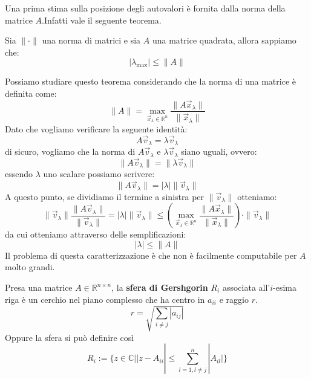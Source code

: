 Una prima stima sulla posizione degli autovalori è fornita dalla norma della
matrice $A$.Infatti vale il seguente teorema.
\begin{teorema}
    Sia $\|\cdot\|$ una norma di matrici e sia $A$ una matrice quadrata, allora
    sappiamo che:
    \begin{equation*}
        |\lambda_{\max}| \leq \|A\|
    \end{equation*}
\end{teorema}
Possiamo studiare questo teorema considerando che la norma di una matrice è
definita come:
\begin{equation*}
    \|A\| = \max_{\vec{x}_\lambda \in \mathbb{R}^n} \frac{\|A\vec{x}_\lambda\|}{\|\vec{x}_\lambda\|}
\end{equation*}
Dato che vogliamo verificare la seguente identità:
\begin{equation*}
    A\vec{v}_\lambda = \lambda \vec{v}_\lambda
\end{equation*}
di sicuro, vogliamo che la norma di $A \vec{v}_\lambda$ e $\lambda \vec{v}_\lambda$
siano uguali, ovvero:
\begin{equation*}
    \|A\vec{v}_\lambda\| = \|\lambda \vec{v}_\lambda\|
\end{equation*}
essendo $\lambda$ uno scalare possiamo scrivere:
\begin{equation*}
    \|A\vec{v}_\lambda\| = |\lambda| \|\vec{v}_\lambda\|
\end{equation*}
A questo punto, se dividiamo il termine a sinistra per $\|\vec{v}_\lambda\|$ otteniamo:
\begin{equation*}
    \|\vec{v}_\lambda\| \frac{\|A\vec{v}_\lambda\|}{\|\vec{v}_\lambda\|} = |\lambda| \|\vec{v}_\lambda\|
    \leq \left(\max_{\vec{x}_\lambda \in \mathbb{R}^n} \frac{\|A\vec{x}_\lambda\|}{\|\vec{x}_\lambda\|}\right) \cdot \|\vec{v}_\lambda\|
\end{equation*}
da cui otteniamo attraverso delle semplificazioni:
\begin{equation*}
    |\lambda| \leq \|A\|
\end{equation*}
Il problema di questa caratterizzazione è che non è facilmente computabile per
$A$ molto grandi.

\begin{definizione} 
    Presa una matrice $A\in \mathbb{R}^{n\times n}$, la \textbf{sfera di Gershgorin} $R_i$ 
    associata all'$i$-esima riga è un cerchio nel piano complesso che ha centro 
    in $a_{ii}$ e raggio $r$.
    $$r = \sqrt{\sum_{i\ne j}|a_{ij}|}$$
    Oppure la sfera si può definire così $$R_i:=\{z\in \mathbb{C}|
    |z-A_{ii}| \leq \sum_{l=1, l\neq j}^{n} |A_{il}|\}$$
\end{definizione}

